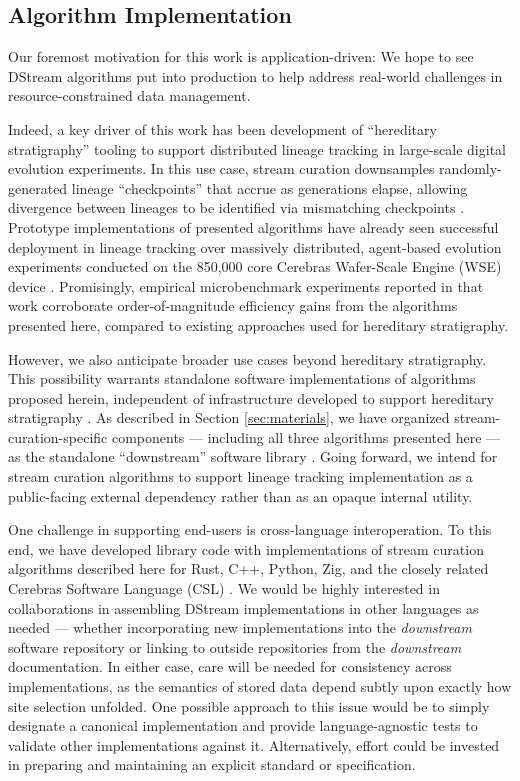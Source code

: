 \subsection{Algorithm Implementation}

Our foremost motivation for this work is application-driven: We hope to see DStream algorithms put into production to help address real-world challenges in resource-constrained data management.

Indeed, a key driver of this work has been development of ``hereditary stratigraphy'' tooling to support distributed lineage tracking in large-scale digital evolution experiments.
In this use case, stream curation downsamples randomly-generated lineage ``checkpoints'' that accrue as generations elapse, allowing divergence between lineages to be identified via mismatching checkpoints \citep{moreno2022hereditary}.
Prototype implementations of presented algorithms have already seen successful deployment in lineage tracking over massively distributed, agent-based evolution experiments conducted on the 850,000 core Cerebras Wafer-Scale Engine (WSE) device \citep{moreno2024trackable}.
Promisingly, empirical microbenchmark experiments reported in that work corroborate order-of-magnitude efficiency gains from the algorithms presented here, compared to existing approaches used for hereditary stratigraphy.

However, we also anticipate broader use cases beyond hereditary stratigraphy.
This possibility warrants standalone software implementations of algorithms proposed herein, independent of infrastructure developed to support hereditary stratigraphy \citep{moreno2022hstrat}.
As described in Section \ref{sec:materials}, we have organized stream-curation-specific components --- including all three algorithms presented here --- as the standalone ``downstream'' software library \citep{moreno2024downstream}.
Going forward, we intend for stream curation algorithms to support lineage tracking implementation as a public-facing external dependency rather than as an opaque internal utility.

One challenge in supporting end-users is cross-language interoperation.
To this end, we have developed library code with implementations of stream curation algorithms described here for Rust, C++, Python, Zig, and the closely related Cerebras Software Language (CSL) \citep{moreno2024hsurf,moreno2024downstream,moreno2024wse}.
We would be highly interested in collaborations in assembling DStream implementations in other languages as needed --- whether incorporating new implementations into the \textit{downstream} software repository or linking to outside repositories from the \textit{downstream} documentation.
In either case, care will be needed for consistency across implementations, as the semantics of stored data depend subtly upon exactly how site selection unfolded.
One possible approach to this issue would be to simply designate a canonical implementation and provide language-agnostic tests to validate other implementations against it.
Alternatively, effort could be invested in preparing and maintaining an explicit standard or specification.
